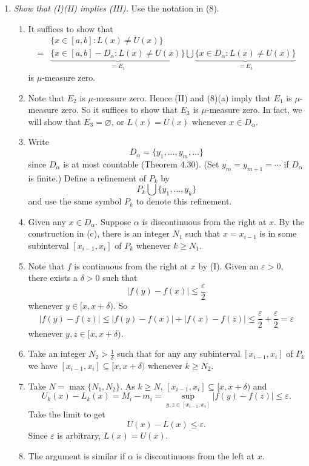 \documentclass{article}
\begin{document}
\begin{enumerate}
\item[(9)]
  \emph{Show that (I)(II) implies (III).}
  Use the notation in (8).
  \begin{enumerate}
  \item[(a)]
    It suffices to show that
    \begin{align*}
      &\{ x \in [a,b] : L(x) \neq U(x) \} \\
      =& \underbrace{\{ x \in [a,b] - D_{\alpha} : L(x) \neq U(x) \}}_{= E_1}
      \bigcup
        \underbrace{\{ x \in D_{\alpha} : L(x) \neq U(x) \}}_{= E_3}
    \end{align*}
    is $\mu$-measure zero.

  \item[(b)]
    Note that $E_2$ is $\mu$-measure zero.
    Hence (II) and (8)(a) imply that $E_1$ is $\mu$-measure zero.
    So it suffices to show that $E_3$ is $\mu$-measure zero.
    In fact, we will show that $E_3 = \varnothing$,
    or $L(x) = U(x)$ whenever $x \in D_{\alpha}$.

  \item[(c)]
    Write
    \[
      D_{\alpha} = \{ y_1, \ldots, y_m, \ldots \}
    \]
    since $D_{\alpha}$ is at most countable (Theorem 4.30).
    (Set $y_m = y_{m+1} = \cdots$ if $D_{\alpha}$ is finite.)
    Define a refinement of $P_k$ by
    \[
      P_k \bigcup \{ y_1, \ldots, y_k \}
    \]
    and use the same symbol $P_k$ to denote this refinement.

  \item[(d)]
    Given any $x \in D_{\alpha}$.
    Suppose $\alpha$ is discontinuous from the right at $x$.
    By the construction in (c),
    there is an integer $N_1$ such that
    $x = x_{i-1}$ is in some subinterval $[x_{i-1},x_{i}]$ of $P_k$
    whenever $k \geq N_1$.

  \item[(e)]
    Note that $f$ is continuous from the right at $x$ by (I).
    Given an $\varepsilon > 0$, there exists a $\delta > 0$ such that
    \[
      |f(y) - f(x)| \leq \frac{\varepsilon}{2}
    \]
    whenever $y \in [x,x+\delta)$.
    So
    \[
      |f(y) - f(z)|
      \leq |f(y) - f(x)| + |f(x) - f(z)|
      \leq \frac{\varepsilon}{2} + \frac{\varepsilon}{2}
      = \varepsilon
    \]
    whenever $y, z \in [x,x+\delta)$.

  \item[(f)]
    Take an integer $N_2 > \frac{1}{\delta}$ such that
    for any any subinterval $[x_{i-1},x_{i}]$ of $P_k$ we have
    $[x_{i-1},x_{i}] \subseteq [x,x+\delta)$ whenever $k \geq N_2$.

  \item[(g)]
    Take $N = \max\{ N_1, N_2 \}$.
    As $k \geq N$, $[x_{i-1},x_{i}] \subseteq [x,x+\delta)$ and
    \[
      U_k(x) - L_k(x)
      = M_i - m_i
      = \sup_{y,z \in [x_{i-1},x_{i}]} |f(y) - f(z)|
      \leq \varepsilon.
    \]
    Take the limit to get
    \[
      U(x) - L(x) \leq \varepsilon.
    \]
    Since $\varepsilon$ is arbitrary, $L(x) = U(x)$.

  \item[(h)]
    The argument is similar if $\alpha$ is discontinuous from the left at $x$.
  \end{enumerate}
\end{enumerate}
\end{document}

